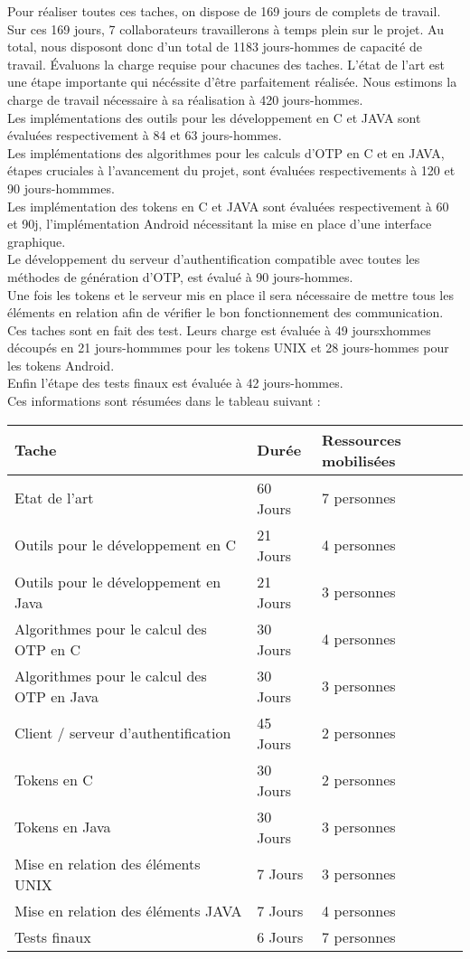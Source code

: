 \documentclass{../../res/univ-projet}
\begin{document}
Pour réaliser toutes ces taches, on dispose de 169 jours de complets de travail. Sur ces 169 jours, 7 collaborateurs travaillerons à temps plein sur le projet.
Au total, nous disposont donc d'un total de 1183 jours-hommes de capacité de travail.
Évaluons la charge requise pour chacunes des taches.
L'état de l'art est une étape importante qui nécéssite d'être parfaitement réalisée. Nous estimons la charge de travail nécessaire à sa réalisation à 420 jours-hommes. \\
Les implémentations des outils pour les développement en C et JAVA sont évaluées respectivement à 84 et 63 jours-hommes. \\
Les implémentations des algorithmes pour les calculs d'OTP en C et en JAVA, étapes cruciales à l'avancement du projet, sont évaluées respectivements à 120 et 90 jours-hommmes. \\
Les implémentation des tokens en C et JAVA sont évaluées respectivement à 60 et 90j, l'implémentation Android nécessitant la mise en place d'une interface graphique. \\
Le développement du serveur d'authentification compatible avec toutes les méthodes de génération d'OTP, est évalué à 90 jours-hommes. \\
Une fois les tokens et le serveur mis en place il sera nécessaire de mettre tous les éléments en relation afin de vérifier le bon fonctionnement des communication. Ces taches sont en fait des test. Leurs charge est évaluée à 49 joursxhommes découpés en 21 jours-hommmes pour les tokens UNIX et 28 jours-hommes pour les tokens Android.\\
Enfin l'étape des tests finaux est évaluée à 42 jours-hommes.\\
Ces informations sont résumées dans le tableau suivant :

\begin{tabular}{|l|l|l|}
Tache & Durée & Ressources mobilisées \\ \hline
Etat de l'art & 60 Jours & 7 personnes \\
Outils pour le développement en C & 21 Jours & 4 personnes \\
Outils pour le développement en Java & 21 Jours & 3 personnes \\
Algorithmes pour le calcul des OTP en C & 30 Jours & 4 personnes \\
Algorithmes pour le calcul des OTP en Java & 30 Jours & 3 personnes \\
Client / serveur d'authentification & 45 Jours & 2 personnes \\
Tokens en C & 30 Jours & 2 personnes \\
Tokens en Java & 30 Jours & 3 personnes \\
Mise en relation des éléments UNIX & 7 Jours & 3 personnes \\
Mise en relation des éléments JAVA & 7 Jours & 4 personnes \\
Tests finaux & 6 Jours & 7 personnes \\ \hline
\end{tabular}
\end{document}
